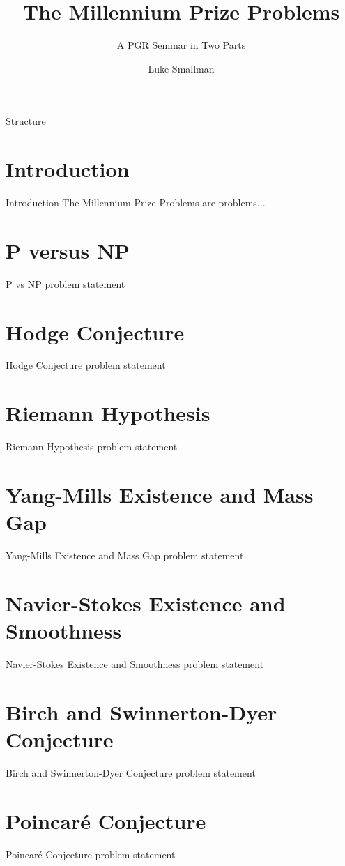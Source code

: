 \documentclass{beamer}
\title{The Millennium Prize Problems}
\subtitle{A PGR Seminar in Two Parts}
\date{}
\author{Luke Smallman}
\institute{Cardiff University} \titlegraphic{\hfill\texttt{[image: logo]}}
\newcommand{\Poincare}{Poincar\'{e}}
\begin{document}
  \maketitle
  \begin{frame}{Structure}
      \begin{multicols}{2}
          \tableofcontents
      \end{multicols}
  \end{frame}

  \section{Introduction}
  \begin{frame}{Introduction}
      The Millennium Prize Problems are problems...
  \end{frame}

  \section{P versus NP}
  \begin{frame}{P vs NP}
      problem statement
  \end{frame}

  \section{Hodge Conjecture}
  \begin{frame}{Hodge Conjecture}
      problem statement
  \end{frame}

  \section{Riemann Hypothesis}
  \begin{frame}{Riemann Hypothesis}
      problem statement
  \end{frame}

  \section{Yang-Mills Existence and Mass Gap}
  \begin{frame}{Yang-Mills Existence and Mass Gap}
      problem statement
  \end{frame}

  \section{Navier-Stokes Existence and Smoothness}
  \begin{frame}{Navier-Stokes Existence and Smoothness}
      problem statement
  \end{frame}

  \section{Birch and Swinnerton-Dyer Conjecture}
  \begin{frame}{Birch and Swinnerton-Dyer Conjecture}
      problem statement
  \end{frame}

  \section{\Poincare{} Conjecture}
  \begin{frame}{\Poincare{} Conjecture}
      problem statement
  \end{frame}
\end{document}
